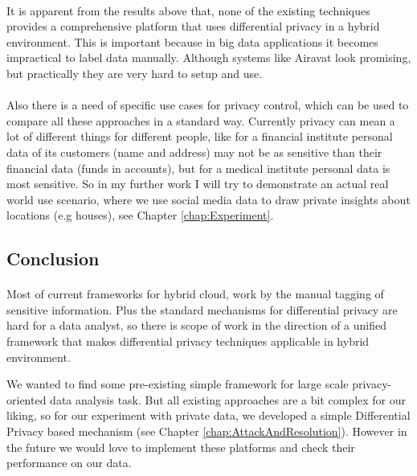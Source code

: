 \documentclass[12pt]{report}
\theoremstyle{named}
\begin{document}
\paragraph{}
It is apparent from the results above that, none of the existing techniques provides a comprehensive platform that uses differential privacy in a hybrid environment. This is important because in big data applications it becomes impractical to label data manually. Although systems like Airavat \cite{roy2010airavat} look promising, but practically they are very hard to setup and use.

\paragraph{}
Also there is a need of specific use cases for privacy control, which can be used to compare all these approaches in a standard way. Currently privacy can mean a lot of different things for different people, like for a financial institute personal data of its customers (name and address) may not be as sensitive than their financial data (funds in accounts), but for a medical institute personal data is most sensitive. So in my further work I will try to demonstrate an actual real world use scenario, where we use social media data to draw private insights about locations (e.g houses), see Chapter \ref{chap:Experiment}.



\subsection{Conclusion}
\paragraph{}
Most of current frameworks for hybrid cloud, work by the manual tagging of sensitive information. Plus the standard mechanisms for differential privacy are hard for a data analyst, so there is scope of work in the direction of a unified framework that makes differential privacy techniques applicable in hybrid environment. 

We wanted to find some pre-existing simple framework for large scale privacy-oriented data analysis task. But all existing approaches are a bit complex for our liking, so for our experiment with private data, we developed a simple Differential Privacy based mechanism (see Chapter \ref{chap:AttackAndResolution}). However in the future we would love to implement these platforms and check their performance on our data.
\end{document}
